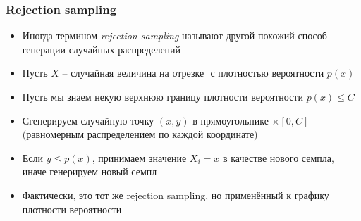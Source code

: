 \documentclass[10pt]{beamer}
\begin{document}
\begin{frame}[fragile]
\frametitle{Rejection sampling}
\begin{itemize}
\item Иногда термином \textit{rejection sampling} называют другой похожий способ генерации случайных распределений
\pause
\item Пусть \begin{math}X\end{math} -- случайная величина на отрезке \begin{math}[a,b]\end{math} с плотностью вероятности \begin{math}p(x)\end{math}
\pause
\item Пусть мы знаем некую верхнюю границу плотности вероятности \begin{math}p(x) \leq C\end{math}
\pause
\item Сгенерируем случайную точку \begin{math}(x,y)\end{math} в прямоугольнике \begin{math}[a,b]\times [0,C]\end{math} (равномерным распределением по каждой координате)
\pause
\item Если \begin{math}y \leq p(x)\end{math}, принимаем значение \begin{math}X_i = x\end{math} в качестве нового семпла, иначе генерируем новый семпл
\pause
\item Фактически, это тот же rejection sampling, но применённый к графику плотности вероятности
\end{itemize}
\end{frame}
\end{document}
